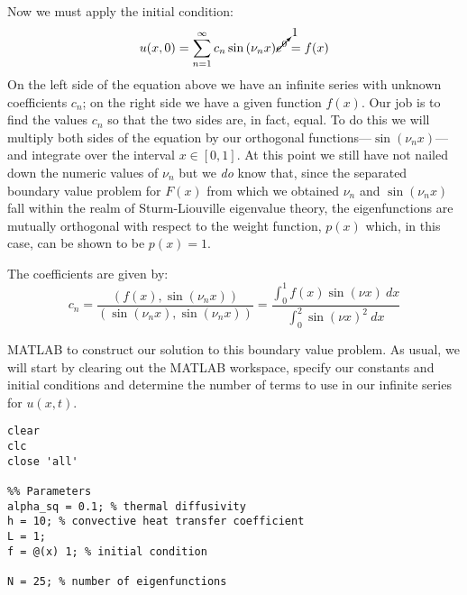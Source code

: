 \noindent Now we must apply the initial condition:
\begin{equation*}
u(x,0) = \sum\limits_{n=1}^{\infty}c_n \sin{(\nu_n x)}\cancelto{1}{e^{0}} = f(x)
\end{equation*}
On the left side of the equation above we have an infinite series with unknown coefficients $c_n$; on the right side we have a given function $f(x)$.  Our job is to find the values $c_n$ so that the two sides are, in fact, equal.  To do this we will multiply both sides of the equation by our orthogonal functions---$\sin{(\nu_n x)}$---and integrate over the interval $x \in [0,1]$.   At this point we still have not nailed down the numeric values of $\nu_n$ but we \emph{do} know that, since the separated boundary value problem for $F(x)$ from which we obtained $\nu_n$ and $\sin{(\nu_n x)}$ fall within the realm of Sturm-Liouville eigenvalue theory, the eigenfunctions are mutually orthogonal with respect to the weight function, $p(x)$ which, in this case, can be shown to be $p(x)=1$. 

The coefficients are given by:
\begin{equation*}
c_n = \frac{\left(f(x),\sin{(\nu_n x)}\right)}{\left( \sin{(\nu_n x)}, \sin{(\nu_n x)}\right)} = \frac{\int_0^1 f(x) \sin{(\nu x)}\ dx}{\int_0^2 \sin{(\nu x)}^2 \ dx}
\end{equation*}

 MATLAB to construct our solution to this boundary value problem.  As usual, we will start by clearing out the MATLAB workspace, specify our constants and initial conditions and determine the number of terms to use in our infinite series for $u(x,t)$.

\begin{lstlisting}[name=lec28-ex1, style=myMatlab]
clear
clc
close 'all'

%% Parameters
alpha_sq = 0.1; % thermal diffusivity
h = 10; % convective heat transfer coefficient
L = 1;
f = @(x) 1; % initial condition

N = 25; % number of eigenfunctions


\end{lstlisting}

